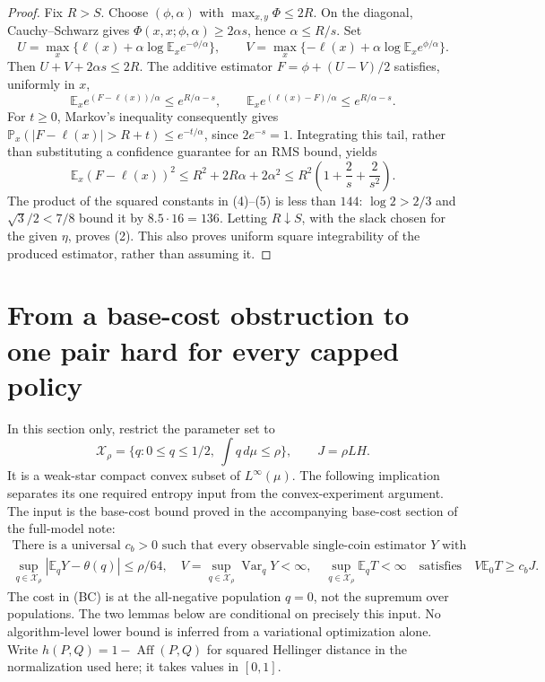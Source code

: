 \documentclass[11pt]{article}
\newcommand{\E}{\mathbb E}
\newcommand{\Pp}{\mathbb P}
\newcommand{\Var}{\operatorname{Var}}
\newcommand{\Aff}{\operatorname{Aff}}
\begin{document}
\begin{proof}
Fix $R>S$. Choose $(\phi,\alpha)$ with
$\max_{x,y}\Phi\le2R$. On the diagonal, Cauchy--Schwarz gives
$\Phi(x,x;\phi,\alpha)\ge2\alpha s$, hence $\alpha\le R/s$.
Set
\[
 U=\max_x\{\ell(x)+\alpha\log\E_xe^{-\phi/\alpha}\},\qquad
 V=\max_x\{-\ell(x)+\alpha\log\E_xe^{\phi/\alpha}\}.
\]
Then $U+V+2\alpha s\le2R$. The additive estimator
$F=\phi+(U-V)/2$ satisfies, uniformly in $x$,
\[
 \E_x e^{(F-\ell(x))/\alpha}\le e^{R/\alpha-s},\qquad
 \E_x e^{(\ell(x)-F)/\alpha}\le e^{R/\alpha-s}.
\]
For $t\ge0$, Markov's inequality consequently gives
$\Pp_x(|F-\ell(x)|>R+t)\le e^{-t/\alpha}$, since $2e^{-s}=1$.
Integrating this tail, rather than substituting a confidence guarantee
for an RMS bound, yields
\[
 \E_x(F-\ell(x))^2
 \le R^2+2R\alpha+2\alpha^2
 \le R^2\left(1+\frac2s+\frac2{s^2}\right).                \tag{5}
\]
The product of the squared constants in (4)--(5) is less than $144$:
$\log2>2/3$ and $\sqrt3/2<7/8$ bound it by $8.5\cdot16=136$.
Letting $R\downarrow S$, with the slack chosen for the given $\eta$,
proves (2). This also proves uniform square integrability of the produced
estimator, rather than assuming it.
\end{proof}

\section{From a base-cost obstruction to one pair hard for every capped policy}
In this section only, restrict the parameter set to
\[
 \mathcal X_\rho=\{q:0\le q\le1/2,\ \int q\,d\mu\le\rho\},
 \qquad J=\rho L H.
\]
It is a weak-star compact convex subset of $L^\infty(\mu)$.
The following implication separates its one required entropy input from
the convex-experiment argument. The input is the base-cost bound proved in
the accompanying base-cost section of the full-model note:
\begin{equation}\label{eq:base-cost-input}
 \begin{gathered}
 \text{There is a universal }c_b>0\text{ such that every observable
 single-coin estimator }Y\text{ with}\\
 \sup_{q\in\mathcal X_\rho}|\E_qY-\theta(q)|\le\rho/64,
 \quad V=\sup_{q\in\mathcal X_\rho}\Var_qY<\infty,
 \quad \sup_{q\in\mathcal X_\rho}\E_qT<\infty
 \quad\text{satisfies}\quad V\E_0T\ge c_bJ.
 \end{gathered}                                                     \tag{BC}
\end{equation}
The cost in (BC) is at the all-negative population $q=0$, not the supremum
over populations. The two lemmas below are conditional on precisely this
input. No algorithm-level lower bound is inferred from a variational
optimization alone. Write
$h(P,Q)=1-\Aff(P,Q)$ for squared Hellinger distance in the normalization
used here; it takes values in $[0,1]$.
\end{document}
